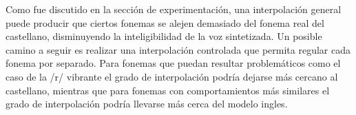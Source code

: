 
Como fue discutido en la sección de experimentación, una interpolación general puede producir que ciertos fonemas se alejen demasiado del fonema real del castellano, disminuyendo la inteligibilidad de la voz sintetizada. Un posible camino a seguir es realizar una interpolación controlada que permita regular cada fonema por separado. Para fonemas que puedan resultar problemáticos como el caso de la /r/ vibrante el grado de interpolación podría dejarse más cercano al castellano, mientras que para fonemas con comportamientos más similares el grado de interpolación podría llevarse más cerca del modelo ingles.


